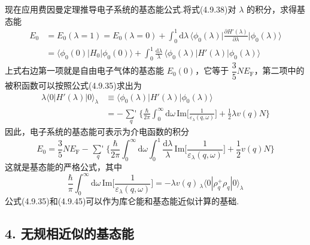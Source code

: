 现在应用费因曼定理推导电子系统的基态能公式.将式(4.9.38)对 $\lambda$ 的积分，求得基态能
\begin{equation}
\begin{aligned}
  E_{0}&=E_{0}\left(\lambda=1\right)=E_{0}\left(\lambda=0\right)
  +\int_{0}^{1}\mathrm{d}\lambda\,
  \bigg\langle\phi_{0}(\lambda)\bigg|
  \frac{\partial H'(\lambda)}{\partial\lambda}\bigg|\phi_{0}(\lambda)\bigg\rangle\\
  &=\big\langle\phi_{0}(0)|H_{0}|\phi_{0}(0)\big\rangle
  +\int_{0}^{1}\frac{\mathrm{d}\lambda}{\lambda}\,
  \big\langle\phi_{0}(\lambda)|H'(\lambda)|\phi_{0}(\lambda)\big\rangle
\end{aligned}
\end{equation}
上式右边第一项就是自由电子气体的基态能 $E_{0}(0)$，它等于 $\dfrac{3}{5}NE_{\mathrm{F}}$，第二项中的被积函数可以按照公式(4.9.35)求出为
\begin{equation}
\begin{aligned}
  \lambda\langle 0|H'(\lambda)|0\rangle_{\lambda}
  &\equiv\big\langle\phi_{0}(\lambda)|H'(\lambda)|\phi_{0}(\lambda)\big\rangle\\
  &=-\mathop{{\sum}'}\limits_{q}\bigg\{\frac{\hbar}{2\pi}
  \int_{0}^{\infty}\mathrm{d}\omega\,
  \mathrm{Im}\bigg[\frac{1}{\varepsilon_{\lambda}(q,\omega)}\bigg]
  +\frac{1}{2}\lambda v(q)N\bigg\}
\end{aligned}
\end{equation}
因此，电子系统的基态能可表示为介电函数的积分
\begin{equation}
  E_{0}=\frac{3}{5}NE_{\mathrm{F}}-\mathop{{\sum}'}\limits_{q}
  \bigg\{\frac{\hbar}{2\pi}\int_{0}^{\infty}\mathrm{d}\omega
  \int_{0}^{1}\frac{\mathrm{d}\lambda}{\lambda}\,
  \mathrm{Im}\bigg[\frac{1}{\varepsilon_{\lambda}(q,\omega)}\bigg]
  +\frac{1}{2}v(q)N\bigg\}
\end{equation}
这就是基态能的严格公式，其中
\begin{equation}
  \frac{\hbar}{\pi}\int_{0}^{\infty}\mathrm{d}\omega\,
  \mathrm{Im}\bigg[\frac{1}{\varepsilon_{\lambda}(q,\omega)}\bigg]
  =-\lambda v(q)\,{}_{\lambda}\langle 0|\rho_{q}^{+}\rho_{q}|0\rangle_{\lambda}
\end{equation}
公式(4.9.35)和(4.9.45)可以作为库仑能和基态能近似计算的基础.

\subsection*{4. 无规相近似的基态能}

